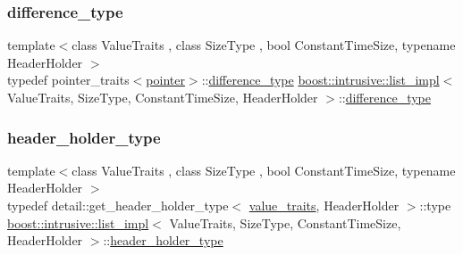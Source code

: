 \subsubsection{\texorpdfstring{difference\+\_\+type}{difference\_type}}
{\footnotesize\ttfamily template$<$class Value\+Traits , class Size\+Type , bool Constant\+Time\+Size, typename Header\+Holder $>$ \\
typedef pointer\+\_\+traits$<$\hyperlink{classboost_1_1intrusive_1_1list__impl_a671027d235426ed75ab9e4b2e090afe5}{pointer}$>$\+::\hyperlink{classboost_1_1intrusive_1_1list__impl_a7053eac84f0c15a33c8192687d0840e3}{difference\+\_\+type} \hyperlink{classboost_1_1intrusive_1_1list__impl}{boost\+::intrusive\+::list\+\_\+impl}$<$ Value\+Traits, Size\+Type, Constant\+Time\+Size, Header\+Holder $>$\+::\hyperlink{classboost_1_1intrusive_1_1list__impl_a7053eac84f0c15a33c8192687d0840e3}{difference\+\_\+type}}

\mbox{\label{classboost_1_1intrusive_1_1list__impl_abd98fa5c33715ec93ec42f3b5755b87b}} 
\subsubsection{\texorpdfstring{header\+\_\+holder\+\_\+type}{header\_holder\_type}}
{\footnotesize\ttfamily template$<$class Value\+Traits , class Size\+Type , bool Constant\+Time\+Size, typename Header\+Holder $>$ \\
typedef detail\+::get\+\_\+header\+\_\+holder\+\_\+type$<$ \hyperlink{classboost_1_1intrusive_1_1list__impl_a5cd55672f6df367749d91ef708834126}{value\+\_\+traits}, Header\+Holder $>$\+::type \hyperlink{classboost_1_1intrusive_1_1list__impl}{boost\+::intrusive\+::list\+\_\+impl}$<$ Value\+Traits, Size\+Type, Constant\+Time\+Size, Header\+Holder $>$\+::\hyperlink{classboost_1_1intrusive_1_1list__impl_abd98fa5c33715ec93ec42f3b5755b87b}{header\+\_\+holder\+\_\+type}}

\mbox{\label{classboost_1_1intrusive_1_1list__impl_a15c0189bf62eb9fb98bc07ef10b8cb23}} 
